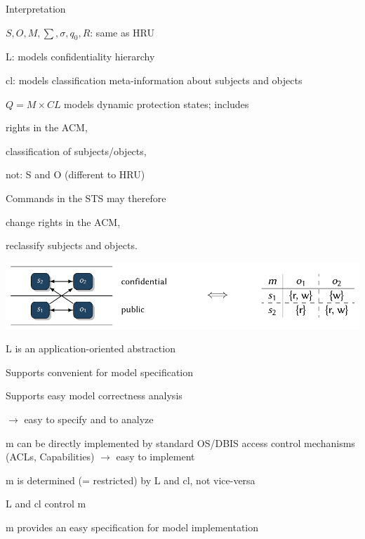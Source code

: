 \documentclass[a4paper]{article}
\begin{document}
\begin{multicols}{3}
    Interpretation
    \begin{itemize*}
        \item $S,O,M,\sum,\sigma,q_0,R$: same as HRU
        \item L: models confidentiality hierarchy
        \item cl: models classification meta-information about subjects and objects
        \item $Q=M\times CL$ models dynamic protection states; includes
        \begin{itemize*}
            \item rights in the ACM,
            \item classification of subjects/objects,
            \item not: S and O (different to HRU)
        \end{itemize*}
        \item Commands in the STS may therefore
        \begin{itemize*}
            \item change rights in the ACM,
            \item reclassify subjects and objects.
        \end{itemize*}
    \end{itemize*}
    \includegraphics[width=\linewidth]{Assets/Systemsicherheit-lattice-vs-acm.png}

    \begin{itemize*}
        \item L is an application-oriented abstraction
        \begin{itemize*}
            \item Supports convenient for model specification
            \item Supports easy model correctness analysis
            \item $\rightarrow$ easy to specify and to analyze
        \end{itemize*}
        \item m can be directly implemented by standard OS/DBIS access control mechanisms (ACLs, Capabilities) $\rightarrow$ easy to implement
        \item m is determined (= restricted) by L and cl, not vice-versa
        \item L and cl control m
        \item m provides an easy specification for model implementation
    \end{itemize*}


\end{multicols}
\end{document}
